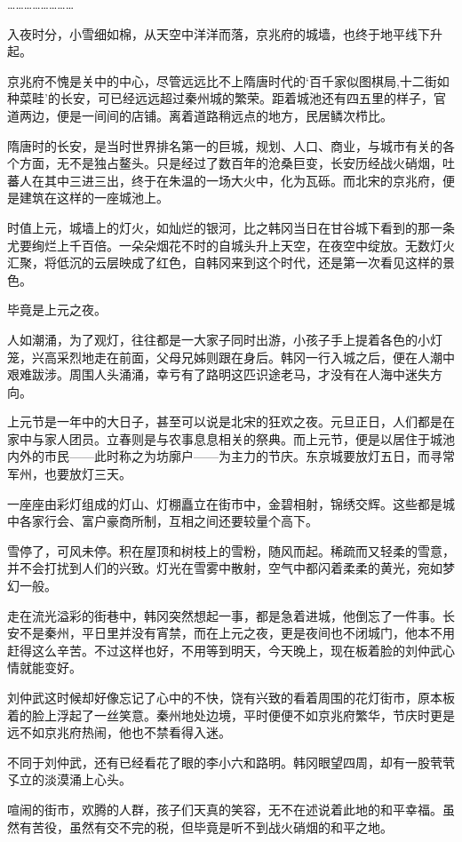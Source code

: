 ……………………

入夜时分，小雪细如棉，从天空中洋洋而落，京兆府的城墙，也终于地平线下升起。

京兆府不愧是关中的中心，尽管远远比不上隋唐时代的‘百千家似图棋局,十二街如种菜畦’的长安，可已经远远超过秦州城的繁荣。距着城池还有四五里的样子，官道两边，便是一间间的店铺。离着道路稍远点的地方，民居鳞次栉比。

隋唐时的长安，是当时世界排名第一的巨城，规划、人口、商业，与城市有关的各个方面，无不是独占鳌头。只是经过了数百年的沧桑巨变，长安历经战火硝烟，吐蕃人在其中三进三出，终于在朱温的一场大火中，化为瓦砾。而北宋的京兆府，便是建筑在这样的一座城池上。

时值上元，城墙上的灯火，如灿烂的银河，比之韩冈当日在甘谷城下看到的那一条尤要绚烂上千百倍。一朵朵烟花不时的自城头升上天空，在夜空中绽放。无数灯火汇聚，将低沉的云层映成了红色，自韩冈来到这个时代，还是第一次看见这样的景色。

毕竟是上元之夜。

人如潮涌，为了观灯，往往都是一大家子同时出游，小孩子手上提着各色的小灯笼，兴高采烈地走在前面，父母兄姊则跟在身后。韩冈一行入城之后，便在人潮中艰难跋涉。周围人头涌涌，幸亏有了路明这匹识途老马，才没有在人海中迷失方向。

上元节是一年中的大日子，甚至可以说是北宋的狂欢之夜。元旦正日，人们都是在家中与家人团员。立春则是与农事息息相关的祭典。而上元节，便是以居住于城池内外的市民——此时称之为坊廓户——为主力的节庆。东京城要放灯五日，而寻常军州，也要放灯三天。

一座座由彩灯组成的灯山、灯棚矗立在街市中，金碧相射，锦绣交辉。这些都是城中各家行会、富户豪商所制，互相之间还要较量个高下。

雪停了，可风未停。积在屋顶和树枝上的雪粉，随风而起。稀疏而又轻柔的雪意，并不会打扰到人们的兴致。灯光在雪雾中散射，空气中都闪着柔柔的黄光，宛如梦幻一般。

走在流光溢彩的街巷中，韩冈突然想起一事，都是急着进城，他倒忘了一件事。长安不是秦州，平日里并没有宵禁，而在上元之夜，更是夜间也不闭城门，他本不用赶得这么辛苦。不过这样也好，不用等到明天，今天晚上，现在板着脸的刘仲武心情就能变好。

刘仲武这时候却好像忘记了心中的不快，饶有兴致的看着周围的花灯街市，原本板着的脸上浮起了一丝笑意。秦州地处边境，平时便便不如京兆府繁华，节庆时更是远不如京兆府热闹，他也不禁看得入迷。

不同于刘仲武，还有已经看花了眼的李小六和路明。韩冈眼望四周，却有一股茕茕孓立的淡漠涌上心头。

喧闹的街市，欢腾的人群，孩子们天真的笑容，无不在述说着此地的和平幸福。虽然有苦役，虽然有交不完的税，但毕竟是听不到战火硝烟的和平之地。

